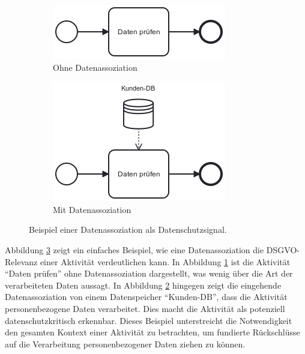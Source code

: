 \begin{figure}
    \centering
    \begin{subfigure}{.5\textwidth}
        \centering
        \includegraphics[width=.7\linewidth]{images/process-models/data-association-example-uncritical}
        \caption{Ohne Datenassoziation}
        \label{fig:without-data-association}
    \end{subfigure}%
    \begin{subfigure}{.5\textwidth}
        \centering
        \includegraphics[width=.7\linewidth]{images/process-models/data-association-example-critical}
        \caption{Mit Datenassoziation}
        \label{fig:with-data-association}
    \end{subfigure}
    \caption{ Beispiel einer Datenassoziation als Datenschutzsignal.}
    \label{fig:data-association-gdpr-example}
\end{figure}

Abbildung \ref{fig:data-association-gdpr-example} zeigt ein einfaches Beispiel, wie eine Datenassoziation die \ac{DSGVO}-Relevanz einer Aktivität verdeutlichen kann. In Abbildung \ref{fig:without-data-association} ist die Aktivität \enquote{Daten prüfen} ohne Datenassoziation dargestellt, was wenig über die Art der verarbeiteten Daten aussagt. In Abbildung \ref{fig:with-data-association} hingegen zeigt die eingehende Datenassoziation von einem Datenspeicher \enquote{Kunden-DB}, dass die Aktivität personenbezogene Daten verarbeitet. Dies macht die Aktivität als potenziell datenschutzkritisch erkennbar. Dieses Beispiel unterstreicht die Notwendigkeit den gesamten Kontext einer Aktivität zu betrachten, um fundierte Rückschlüsse auf die Verarbeitung personenbezogener Daten ziehen zu können.